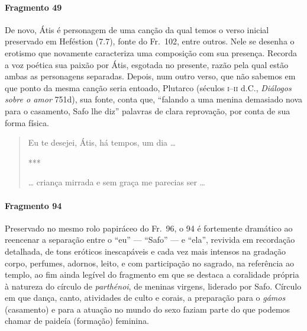 \paragraph{Fragmento 49}

{\small De novo, Átis é personagem de uma canção da qual temos o verso inicial preservado em Heféstion (7.7), fonte do Fr.~102, entre outros. Nele se desenha o erotismo que novamente caracteriza uma composição com sua presença. Recorda a voz poética sua paixão por Átis, esgotada no presente, razão pela qual estão ambas as personagens separadas. Depois, num outro verso, que não sabemos em que ponto da mesma canção seria entoado, Plutarco (séculos \textsc{i}--\textsc{ii} d.C., \textit{Diálogos sobre o amor} 751d),
sua fonte, conta que, “falando a uma menina demasiado nova para o
casamento, Safo lhe diz” palavras de clara reprovação, por conta de sua forma
física. }

\begin{verse}
Eu te desejei, Átis, há tempos, um dia \ldots{}

***

\ldots{} criança mirrada e sem graça me parecias \qb{}ser \ldots{}
\end{verse}


\paragraph{Fragmento 94}

{\small Preservado no mesmo rolo papiráceo do Fr.~96, o 94 é fortemente dramático ao
reencenar a separação entre o “eu” --- ``Safo” --- e “ela”, revivida em
recordação detalhada, de tons eróticos inescapáveis e cada vez mais intensos na
gradação corpo, perfumes, adornos, leito, e com participação no sagrado, na
referência ao templo, ao fim ainda legível do fragmento em que se destaca a coralidade própria à natureza do círculo de \textit{parthénoi}, de meninas virgens, liderado por Safo. Círculo em que dança, canto, atividades de culto e corais, a preparação para o \textit{gámos} (casamento) e para a atuação no mundo do sexo faziam parte do que podemos chamar de paideía (formação) feminina.}

